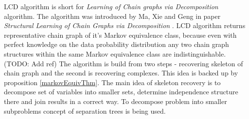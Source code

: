 %
%

LCD algorithm is short for \textit{Learning of Chain graphs via Decomposition} algorithm. The algorithm was introduced by Ma, Xie and Geng in paper \textit{Structural Learning of Chain Graphs via Decomposition} \cite{CG}. LCD algorithm returns 
representative chain graph of it's Markov equivalence class, because even with perfect knowledge on the data probability
distribution any two chain graph structures within the same Markov equivalence class are indistinguishable. (TODO: Add ref)
The algorithm is build from two steps - recovering skeleton of chain graph and the second is recovering complexes. This
idea is backed up by proposition \ref{markovEquivThm}. 
The main idea of skeleton recovery is to decompose set of variables into smaller sets, determine independence structure there and join results in a correct way. To decompose problem into smaller subproblems concept of 
separation trees is being used.


